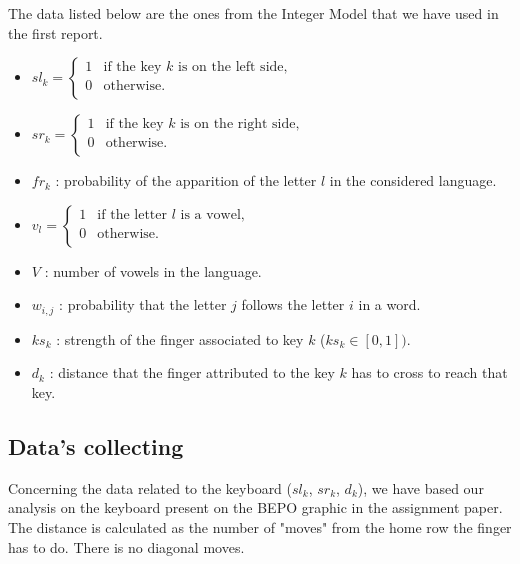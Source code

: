 \documentclass[a4paper,titlepage]{article}
\begin{document}
The data listed below are the ones from the Integer Model that we have used in the first report.
\begin{itemize}		
	\item $sl_{k} = \left\{ 
	\begin{array}{ll}
		1 & \text{if the key $k$ is on the left side,}\\
		0 & \text{otherwise.}\\
	\end{array}
	\right.$

	\item $sr_{k} = \left\{ 
	\begin{array}{ll}
		1 & \text{if the key $k$ is on the right side,}\\
		0 & \text{otherwise.}\\
	\end{array}
	\right.$

	\item $fr_k$ : probability of the apparition of the letter $l$ in the considered language.

	\item $v_{l} = \left\{ 
	\begin{array}{ll}
		1 & \text{if the letter $l$ is a vowel,}\\
		0 & \text{otherwise.}\\
	\end{array}
	\right.$

	\item $V$ : number of vowels in the language.

	\item $w_{i,j}$ : probability that the letter $j$ follows the letter $i$ in a word. 

	\item $ks_{k}$ : strength of the finger associated to key $k$ ($ks_k \in [0,1])$.

	\item $d_k$ : distance that the finger attributed to the key $k$ has to cross to reach that key.
\end{itemize}

	\subsection{Data's collecting}

Concerning the data related to the keyboard ($sl_{k}$, $sr_{k}$, $d_{k}$), we have based our analysis on the keyboard present on the BEPO graphic in the assignment paper. The distance is calculated as the number of "moves" from the home row the finger has to do. There is no diagonal moves. 
\end{document}
